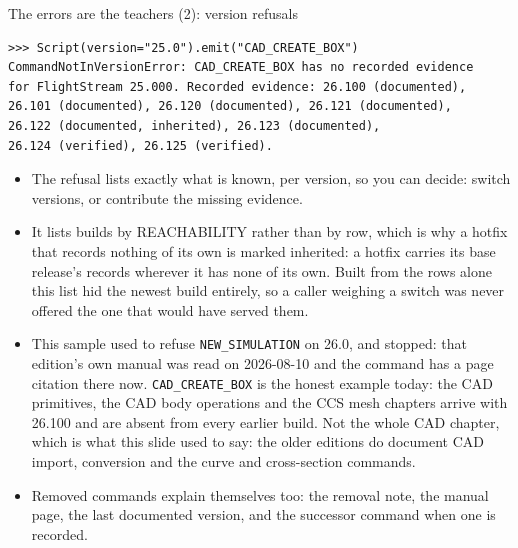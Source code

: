 \documentclass[aspectratio=169,10pt]{beamer}
\newcommand{\code}[1]{\texttt{\small #1}}
\begin{document}
\begin{frame}{The errors are the teachers (2): version refusals}
\begin{lstlisting}[style=txt]
>>> Script(version="25.0").emit("CAD_CREATE_BOX")
CommandNotInVersionError: CAD_CREATE_BOX has no recorded evidence
for FlightStream 25.000. Recorded evidence: 26.100 (documented),
26.101 (documented), 26.120 (documented), 26.121 (documented),
26.122 (documented, inherited), 26.123 (documented),
26.124 (verified), 26.125 (verified).
\end{lstlisting}
  \begin{itemize}
    \item The refusal lists exactly what is known, per version, so you can decide: switch versions, or contribute the missing evidence.
    \item It lists builds by REACHABILITY rather than by row, which is why a hotfix that records nothing of its own is marked inherited: a hotfix carries its base release's records wherever it has none of its own. Built from the rows alone this list hid the newest build entirely, so a caller weighing a switch was never offered the one that would have served them.
    \item This sample used to refuse \code{NEW\_SIMULATION} on 26.0, and stopped: that edition's own manual was read on 2026-08-10 and the command has a page citation there now. \code{CAD\_CREATE\_BOX} is the honest example today: the CAD primitives, the CAD body operations and the CCS mesh chapters arrive with 26.100 and are absent from every earlier build. Not the whole CAD chapter, which is what this slide used to say: the older editions do document CAD import, conversion and the curve and cross-section commands.
    \item Removed commands explain themselves too: the removal note, the manual page, the last documented version, and the successor command when one is recorded.
  \end{itemize}
\end{frame}
\end{document}
